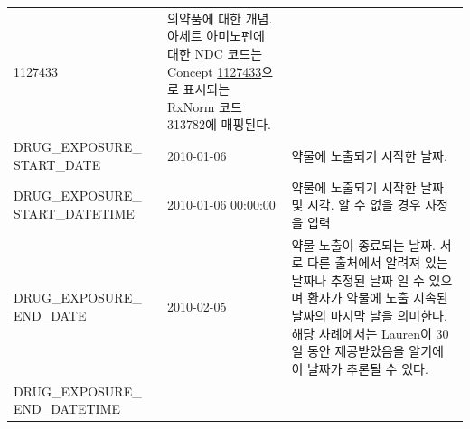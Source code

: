 \documentclass[11pt]{book}
\theoremstyle{definition}
\theoremstyle{definition}
\theoremstyle{definition}
\theoremstyle{remark}
\begin{document}
\begin{longtable}[]{@{}lll@{}}
\begin{minipage}[t]{0.16\columnwidth}
1127433\strut
\end{minipage} & \begin{minipage}[t]{0.48\columnwidth}\raggedright\strut
의약품에 대한 개념. 아세트 아미노펜에 대한 NDC 코드는 Concept
\href{http://athena.ohdsi.org/search-terms/terms/1127433}{1127433}으로
표시되는 RxNorm 코드 313782에 매핑된다.\strut
\end{minipage}\tabularnewline
\begin{minipage}[t]{0.28\columnwidth}\raggedright\strut
DRUG\_EXPOSURE\_ START\_DATE\strut
\end{minipage} & \begin{minipage}[t]{0.16\columnwidth}\raggedright\strut
2010-01-06\strut
\end{minipage} & \begin{minipage}[t]{0.48\columnwidth}\raggedright\strut
약물에 노출되기 시작한 날짜.\strut
\end{minipage}\tabularnewline
\begin{minipage}[t]{0.28\columnwidth}\raggedright\strut
DRUG\_EXPOSURE\_ START\_DATETIME\strut
\end{minipage} & \begin{minipage}[t]{0.16\columnwidth}\raggedright\strut
2010-01-06 00:00:00\strut
\end{minipage} & \begin{minipage}[t]{0.48\columnwidth}\raggedright\strut
약물에 노출되기 시작한 날짜 및 시각. 알 수 없을 경우 자정을 입력\strut
\end{minipage}\tabularnewline
\begin{minipage}[t]{0.28\columnwidth}\raggedright\strut
DRUG\_EXPOSURE\_ END\_DATE\strut
\end{minipage} & \begin{minipage}[t]{0.16\columnwidth}\raggedright\strut
2010-02-05\strut
\end{minipage} & \begin{minipage}[t]{0.48\columnwidth}\raggedright\strut
약물 노출이 종료되는 날짜. 서로 다른 출처에서 알려져 있는 날짜나 추정된
날짜 일 수 있으며 환자가 약물에 노출 지속된 날짜의 마지막 날을 의미한다.
해당 사례에서는 Lauren이 30일 동안 제공받았음을 알기에 이 날짜가 추론될
수 있다.\strut
\end{minipage}\tabularnewline
\begin{minipage}[t]{0.28\columnwidth}\raggedright\strut
DRUG\_EXPOSURE\_ END\_DATETIME\strut
\end{minipage} & \begin{minipage}[t]{0.16\columnwidth}\raggedright\strut

\end{minipage}
\end{longtable}
\end{document}
